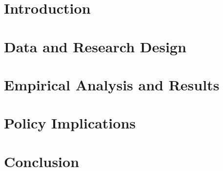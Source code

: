 \section{Introduction}
\label{C1-Section:Introduction}



\section{Data and Research Design}
\label{C1-Section:Data-and-Research-Design}



\section{Empirical Analysis and Results}
\label{C1-Section:Empirical-Analysis-and-Results}



\section{Policy Implications}
\label{C1-Section:Policy-Implications}



\section{Conclusion}
\label{C1-Section:Conclusion}



\clearpage

